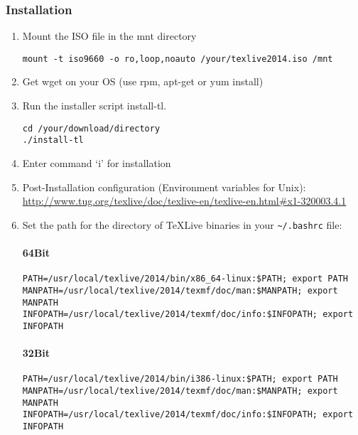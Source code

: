 \documentclass[times,twoside,11pt]{article}
\begin{document}
\subsubsection*{Installation}
\begin{enumerate}
\item	
	Mount the ISO file in the mnt directory
	\begin{lstlisting}[style=shell]
	mount -t iso9660 -o ro,loop,noauto /your/texlive2014.iso /mnt
	\end{lstlisting}

\item
	Get wget on your OS (use rpm, apt-get or yum install)
\item
	Run the installer script install-tl.

\begin{lstlisting}[style=shell]
cd /your/download/directory
./install-tl
\end{lstlisting}

\item
	Enter command `i' for installation

\item
	Post-Installation configuration (Environment variables for Unix): 
	\url{http://www.tug.org/texlive/doc/texlive-en/texlive-en.html\#x1-320003.4.1}
\item	
	Set the path for the directory of \TeX Live binaries in your 
	\verb|~/.bashrc| 
	file:

\paragraph{64Bit}

\begin{verbatim}
PATH=/usr/local/texlive/2014/bin/x86_64-linux:$PATH; export PATH
MANPATH=/usr/local/texlive/2014/texmf/doc/man:$MANPATH; export MANPATH 
INFOPATH=/usr/local/texlive/2014/texmf/doc/info:$INFOPATH; export INFOPATH
\end{verbatim}

\paragraph{32Bit}

\begin{verbatim}
PATH=/usr/local/texlive/2014/bin/i386-linux:$PATH; export PATH 
MANPATH=/usr/local/texlive/2014/texmf/doc/man:$MANPATH; export MANPATH 
INFOPATH=/usr/local/texlive/2014/texmf/doc/info:$INFOPATH; export INFOPATH
\end{verbatim}

\end{enumerate}
\end{document}
